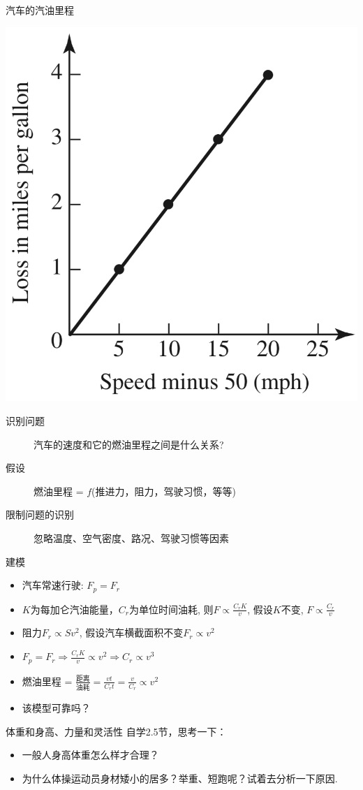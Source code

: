 \documentclass[UTF8, mathserif]{ctexbeamer}
\begin{document}
\begin{frame}{汽车的汽油里程}
  \begin{center}
    \includegraphics[width=.2\textwidth{}]{papersays.png}
  \end{center}

  \begin{description}
  \item[识别问题] 汽车的速度和它的燃油里程之间是什么关系?
  \item[假设] 燃油里程 = $f$(推进力，阻力，驾驶习惯，等等)
  \item[限制问题的识别] 忽略温度、空气密度、路况、驾驶习惯等因素
  \end{description}

\end{frame}

\begin{frame}{建模}

  \begin{itemize}
  \item 汽车常速行驶: $F_p = F_r$
  \item $K$为每加仑汽油能量，$C_r$为单位时间油耗, 则$F \propto \frac{C_rK}{v}$, 假设$K$不变, $F \propto \frac{C_r}{v}$
  \item 阻力$F_r \propto Sv^2$, 假设汽车横截面积不变$F_r \propto v^2$
  \item $F_p = F_r \Rightarrow \frac{C_rK}{v} \propto v^2 \Rightarrow C_r \propto v^3$
  \item 燃油里程 = $\frac{\text{距离}}{\text{油耗}} = \frac{vt}{C_rt}=\frac{v}{C_r}\propto v^2$
  \item 该模型可靠吗？
  \end{itemize}
  
\end{frame}

\begin{frame}{体重和身高、力量和灵活性}
  自学2.5节，思考一下：

  \begin{itemize}
  \item 一般人身高体重怎么样才合理？
  \item 为什么体操运动员身材矮小的居多？举重、短跑呢？试着去分析一下原因.
  \end{itemize}

\end{frame}
\end{document}
